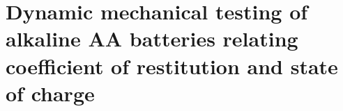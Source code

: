 
\chapter{Dynamic mechanical testing of alkaline AA batteries relating coefficient of restitution and state of charge\label{ch:dbb}}








